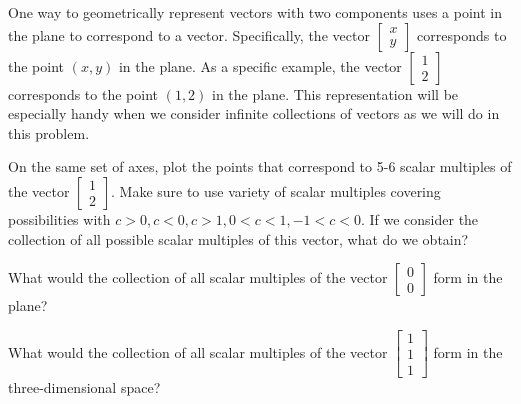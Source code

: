 \begin{pa}
		

\item One way to geometrically represent vectors with two components uses a point in the plane to correspond to a vector. Specifically, the vector $\left[ \begin{array}{c} x \\ y \end{array} \right]$ corresponds to the point $(x, y)$ in the plane. As a specific example, the vector $\left[ \begin{array}{c} 1 \\ 2 \end{array} \right]$ corresponds to the point $(1, 2)$ in the plane. This representation will be especially handy when we consider infinite collections of vectors as we will do in this problem.

\ba
\item On the same set of axes, plot the points that correspond to 5-6 scalar multiples of the vector $\left[ \begin{array}{c} 1 \\ 2 \end{array} \right]$. Make sure to use  variety of scalar multiples covering possibilities with $c>0, c<0, c>1, 0<c<1, -1<c<0$. If we consider the collection of all possible scalar multiples of this vector, what do we obtain?

 

\begin{comment}
This gives us a line through the origin and the point $(1,2)$.



\end{comment}

\item What would the collection of all scalar multiples of the vector $\left[ \begin{array}{c} 0 \\ 0 \end{array} \right]$ form in the plane? 

 

\begin{comment}
We only get the origin.
\end{comment}

\item What would the collection of all scalar multiples of the vector $\left[ \begin{array}{c} 1 \\ 1\\ 1 \end{array} \right]$ form in the three-dimensional space? 




\end{pa}

